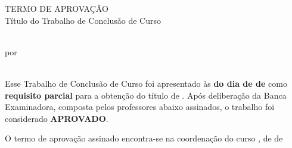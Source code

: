 \begin{folhadeaprovacao}
    \vspace{0.5cm}
    
    \noindent\hrulefill
    
    \begin{center}
        TERMO DE APROVAÇÃO\\[5pt]
        Título do Trabalho de Conclusão de Curso \numero{\numerotcc{}}
    \end{center}
    \begin{center}
        \large\textbf{\imprimirtitulo}\\[10pt]
        por\\[10pt]
        \imprimirautor\\[15pt]
    \end{center}
        
    \noindent Esse Trabalho de Conclusão de Curso foi apresentado às \textbf{\hora{} do dia \dia{} de \mes{} de \ano{}} como \textbf{requisito parcial} para a obtenção do título de \textbf{\imprimirtituloAcademico}. Após deliberação da Banca Examinadora, composta pelos professores abaixo assinados, o trabalho foi considerado \textbf{APROVADO}.
        
    \begin{center}
        \assinatura{\membroA}
        \assinatura{\membroB}
        \assinatura{\imprimirorientador \\UTFPR}
    \end{center}
    
 	\begin{center}
 	\small O termo de aprovação assinado encontra-se na coordenação do curso
	\vfill
	{\large\imprimirlocal, \dia{} de \mes{} de \ano{}}
	\end{center}
	
\end{folhadeaprovacao}
	
